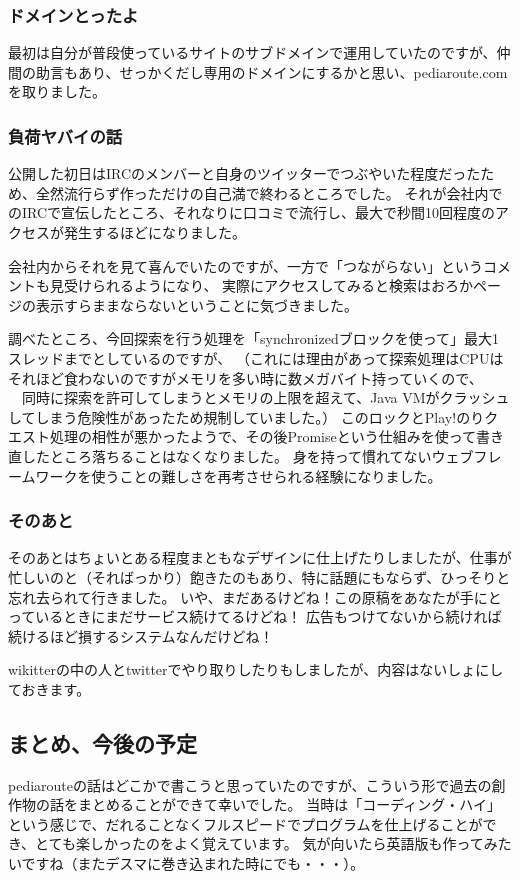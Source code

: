 \subsubsection{ドメインとったよ}
最初は自分が普段使っているサイトのサブドメインで運用していたのですが、仲間の助言もあり、せっかくだし専用のドメインにするかと思い、pediaroute.comを取りました。

\subsubsection{負荷ヤバイの話}
公開した初日はIRCのメンバーと自身のツイッターでつぶやいた程度だったため、全然流行らず作っただけの自己満で終わるところでした。
それが会社内でのIRCで宣伝したところ、それなりに口コミで流行し、最大で秒間10回程度のアクセスが発生するほどになりました。

会社内からそれを見て喜んでいたのですが、一方で「つながらない」というコメントも見受けられるようになり、
実際にアクセスしてみると検索はおろかページの表示すらままならないということに気づきました。

調べたところ、今回探索を行う処理を「synchronizedブロックを使って」最大1スレッドまでとしているのですが、
（これには理由があって探索処理はCPUはそれほど食わないのですがメモリを多い時に数メガバイト持っていくので、
　同時に探索を許可してしまうとメモリの上限を超えて、Java VMがクラッシュしてしまう危険性があったため規制していました。）
このロックとPlay!のりクエスト処理の相性が悪かったようで、その後Promiseという仕組みを使って書き直したところ落ちることはなくなりました。
身を持って慣れてないウェブフレームワークを使うことの難しさを再考させられる経験になりました。

\subsubsection{そのあと}
そのあとはちょいとある程度まともなデザインに仕上げたりしましたが、仕事が忙しいのと（そればっかり）飽きたのもあり、特に話題にもならず、ひっそりと忘れ去られて行きました。
いや、まだあるけどね！この原稿をあなたが手にとっているときにまだサービス続けてるけどね！
広告もつけてないから続ければ続けるほど損するシステムなんだけどね！

wikitterの中の人とtwitterでやり取りしたりもしましたが、内容はないしょにしておきます。

\subsection{まとめ、今後の予定}
pediarouteの話はどこかで書こうと思っていたのですが、こういう形で過去の創作物の話をまとめることができて幸いでした。
当時は「コーディング・ハイ」という感じで、だれることなくフルスピードでプログラムを仕上げることができ、とても楽しかったのをよく覚えています。
気が向いたら英語版も作ってみたいですね（またデスマに巻き込まれた時にでも・・・）。
